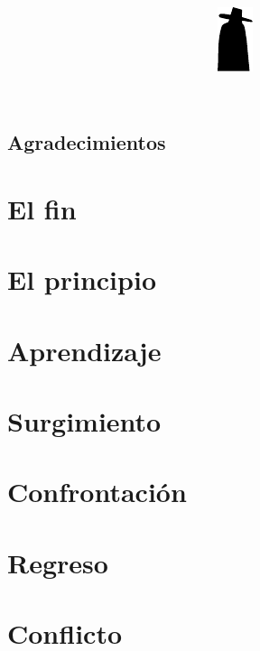 \documentclass[11pt]{book}
\title{
    \includegraphics{images/minicaido.pdf}\\
    \medskip
    \textbf{\Huge\titlename}
    \setcounter{page}{3}
}
\author{\textit{\authorname}}
\date{}
\begin{document}
\pagestyle{empty}
\hbox{}\cleardoublepage
\maketitle


\begin{small}
    \chapter*{Agradecimientos}\thispagestyle{empty}
    \thispagestyle{empty}
\end{small}

\pagestyle{fancyplain}
\chapter{El fin}


\chapter{El principio}


\chapter{Aprendizaje}


\chapter{Surgimiento}


\chapter{Confrontación}


\chapter{Regreso}


\chapter{Conflicto}

\end{document}
